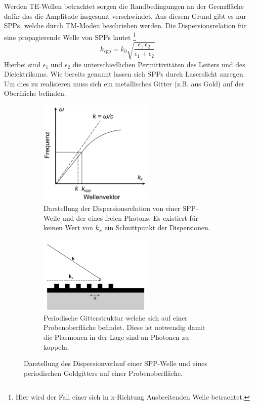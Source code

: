Werden TE-Wellen betrachtet sorgen die Randbedingungen an der Grenzfläche
dafür das die Amplitude insgesamt verschwindet.\cite{plasmonics} 
Aus diesem Grund gibt es nur SPPs, welche durch TM-Moden beschrieben werden. 
Die Dispersionsrelation für eine propagierende Welle von SPPs lautet
\footnote{Hier wird der Fall einer sich in x-Richtung Ausbreitenden Welle betrachtet.}
\begin{equation}
    k_\text{spp} = k_0 \sqrt{\frac{\epsilon_1 \,\epsilon_2}{\epsilon_1 + \epsilon_2}}.
    \label{eq:disp}
\end{equation}
Hierbei sind $\epsilon_1$ und $\epsilon_2$ die unterschiedlichen Permittivitäten des Leiters und
des Dielektrikums.
Wie bereits genannt lassen sich SPPs durch Laserslicht anregen. 
Um dies zu realisieren muss sich ein metallisches Gitter (z.B. aus Gold) auf der Oberfläche befinden.

\begin{figure}
    \centering
    \begin{subfigure}{0.5\textwidth}
        \centering
        \includegraphics[width=5.5cm]{./Plots/disp.png}
        \caption{Darstellung der Dispersionsrelation von einer SPP-Welle und der eines freien Photons.
        Es existiert für keinen Wert von $k_x$ ein Schnittpunkt der Dispersionen. \cite{disp}}
        \label{fig:disp}
    \end{subfigure}
    \begin{subfigure}{0.5\textwidth}
        \centering
        \includegraphics[width=5.5cm]{./Plots/gitter.png}
        \caption{Periodische Gitterstruktur welche sich auf einer Probenoberfläche befindet. 
        Diese ist notwendig damit die Plasmonen in der Lage sind an Photonen zu koppeln.\cite{disp} }
        \label{fig:gitter}
    \end{subfigure}
    \caption{Darstellung des Dispersionverlauf einer SPP-Welle und eines periodischen Goldgitters auf einer Probenoberfläche.}
    \label{fig:disp_und_gitter}
\end{figure}
\FloatBarrier

